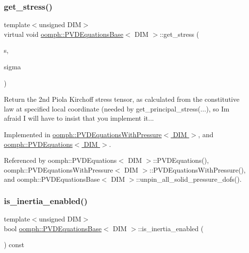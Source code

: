 \subsubsection{\texorpdfstring{get\+\_\+stress()}{get\_stress()}}
{\footnotesize\ttfamily template$<$unsigned D\+IM$>$ \\
virtual void \hyperlink{classoomph_1_1PVDEquationsBase}{oomph\+::\+P\+V\+D\+Equations\+Base}$<$ D\+IM $>$\+::get\+\_\+stress (\begin{DoxyParamCaption}\item[{const \hyperlink{classoomph_1_1Vector}{Vector}$<$ double $>$ \&}]{s,  }\item[{\hyperlink{classoomph_1_1DenseMatrix}{Dense\+Matrix}$<$ double $>$ \&}]{sigma }\end{DoxyParamCaption})\hspace{0.3cm}{\ttfamily [pure virtual]}}



Return the 2nd Piola Kirchoff stress tensor, as calculated from the constitutive law at specified local coordinate (needed by {\ttfamily get\+\_\+principal\+\_\+stress}(...), so I\textquotesingle{}m afraid I will have to insist that you implement it... 



Implemented in \hyperlink{classoomph_1_1PVDEquationsWithPressure_a15cfb4084a47c24f7cf108554a4b850d}{oomph\+::\+P\+V\+D\+Equations\+With\+Pressure$<$ D\+I\+M $>$}, and \hyperlink{classoomph_1_1PVDEquations_add6a194b0138b09834022b29bbc75eb6}{oomph\+::\+P\+V\+D\+Equations$<$ D\+I\+M $>$}.



Referenced by oomph\+::\+P\+V\+D\+Equations$<$ D\+I\+M $>$\+::\+P\+V\+D\+Equations(), oomph\+::\+P\+V\+D\+Equations\+With\+Pressure$<$ D\+I\+M $>$\+::\+P\+V\+D\+Equations\+With\+Pressure(), and oomph\+::\+P\+V\+D\+Equations\+Base$<$ D\+I\+M $>$\+::unpin\+\_\+all\+\_\+solid\+\_\+pressure\+\_\+dofs().

\mbox{\label{classoomph_1_1PVDEquationsBase_a773736f5212c899043a8549931a52c7f}} 
\subsubsection{\texorpdfstring{is\+\_\+inertia\+\_\+enabled()}{is\_inertia\_enabled()}}
{\footnotesize\ttfamily template$<$unsigned D\+IM$>$ \\
bool \hyperlink{classoomph_1_1PVDEquationsBase}{oomph\+::\+P\+V\+D\+Equations\+Base}$<$ D\+IM $>$\+::is\+\_\+inertia\+\_\+enabled (\begin{DoxyParamCaption}{ }\end{DoxyParamCaption}) const\hspace{0.3cm}{\ttfamily [inline]}}




